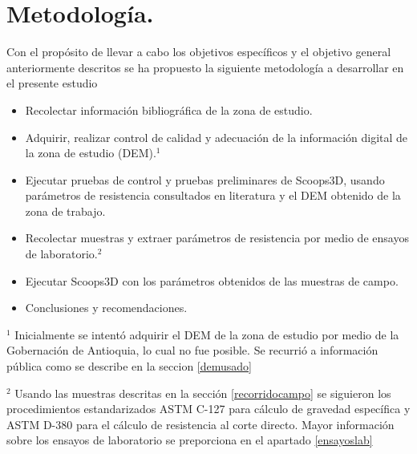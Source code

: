 \chapter{Metodolog\'ia.}



Con el prop\'osito de llevar a cabo los objetivos espec\'ificos y el objetivo general anteriormente descritos se ha propuesto la siguiente metodolog\'ia a desarrollar en el presente estudio

\begin{itemize}


\item Recolectar informaci\'on bibliogr\'afica de la zona de estudio.
\item Adquirir, realizar control de calidad y adecuaci\'on de la informaci\'on digital de la zona de estudio (DEM).$^{1}$
\item Ejecutar pruebas de control y pruebas preliminares de Scoops3D, usando par\'ametros de resistencia consultados en literatura y el DEM obtenido de la zona de trabajo.
\item Recolectar muestras y extraer par\'ametros de resistencia por medio de ensayos de laboratorio.$^{2}$
 \item Ejecutar Scoops3D con los par\'ametros obtenidos de las muestras de campo.
 \item Conclusiones y recomendaciones.
\end{itemize}


$^{1}$ Inicialmente se intent\'o adquirir el DEM de la zona de estudio por medio de la Gobernaci\'on de Antioquia, lo cual no fue posible. Se recurri\'o a informaci\'on p\'ublica como se describe en la seccion \ref{demusado}

$^{2}$ Usando las muestras descritas en la secci\'on  \ref{recorridocampo} se siguieron los procedimientos estandarizados ASTM C-127 para c\'alculo de gravedad espec\'ifica y ASTM D-380 para el c\'alculo de resistencia al corte directo.
Mayor informaci\'on sobre los ensayos de laboratorio se preporciona en el apartado \ref{ensayoslab}



